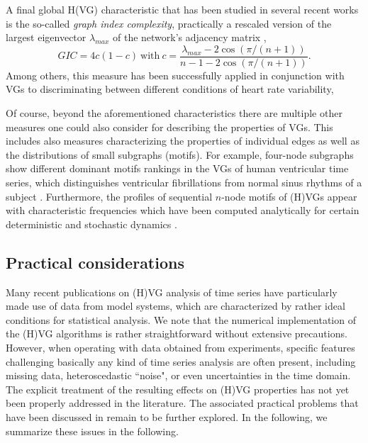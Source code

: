     A final global H(VG) characteristic that has been studied in several recent works \cite{Ahmadlou2010,Tang2013,Nasrolahzadeh2018} is the so-called \emph{graph index complexity}, practically a rescaled version of the largest eigenvector $\lambda_{max}$ of the network's adjacency matrix \cite{Kim2008},
    \begin{equation}
    GIC=4c(1-c)\ \mbox{with}\ c=\frac{\lambda_{max}-2\cos(\pi/(n+1))}{n-1-2\cos(\pi/(n+1))}.
    \label{gic}
    \end{equation}
    \noindent
    Among others, this measure has been successfully applied in conjunction with VGs to discriminating between different conditions of heart rate variability,
    
		Of course, beyond the aforementioned characteristics there are multiple other measures one could also consider for describing the properties of VGs. This includes also measures characterizing the properties of individual edges as well as the distributions of small subgraphs (motifs). For example, four-node subgraphs show different dominant motifs rankings in the VGs of human ventricular time series, which distinguishes ventricular fibrillations from normal sinus rhythms of a subject \cite{Li2011,Li2012}. Furthermore, the profiles of sequential $n$-node motifs of (H)VGs appear with characteristic frequencies which have been computed analytically for certain deterministic and stochastic dynamics \cite{Iacovacci2016}. 
		
		\subsection{Practical considerations} \label{secsec:VGpractical}
		Many recent publications on (H)VG analysis of time series have particularly made use of data from model systems, which are characterized by rather ideal conditions for statistical analysis. We note that the numerical implementation of the (H)VG algorithms is rather straightforward without extensive precautions. However, when operating with data obtained from experiments, specific features challenging basically any kind of time series analysis are often present, including missing data, heteroscedastic ``noise", or even uncertainties in the time domain. The explicit treatment of the resulting effects on (H)VG properties has not yet been properly addressed in the literature. The associated practical problems that have been discussed in \cite{Donner2012} remain to be further explored. In the following, we summarize these issues in the following. 
		
